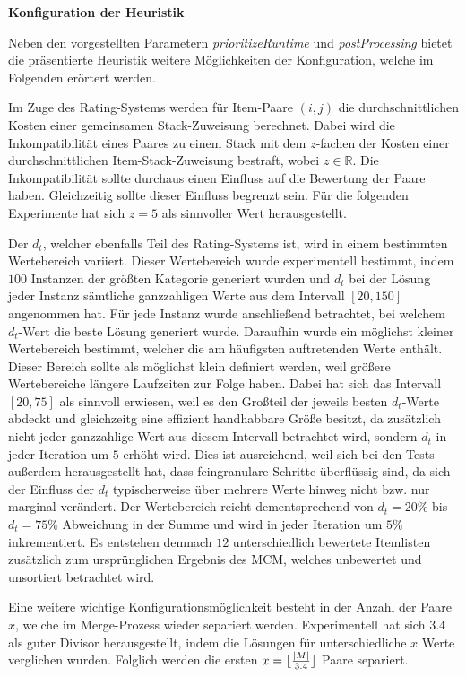 \textbf{Konfiguration der Heuristik}

Neben den vorgestellten Parametern \textit{prioritizeRuntime} und \textit{postProcessing} bietet
die präsentierte Heuristik weitere Möglichkeiten der Konfiguration, welche im Folgenden erörtert werden.

\vfill
\pagebreak

Im Zuge des Rating-Systems werden für Item-Paare $(i, j)$ die durchschnittlichen Kosten einer gemeinsamen
Stack-Zuweisung berechnet. Dabei wird die Inkompatibilität eines Paares zu einem Stack mit dem $z$-fachen
der Kosten einer durchschnittlichen Item-Stack-Zuweisung bestraft, wobei $z \in \mathbb{R}$.
Die Inkompatibilität sollte durchaus einen Einfluss auf die Bewertung der Paare haben.
Gleichzeitig sollte dieser Einfluss begrenzt sein. Für die folgenden Experimente hat sich $z = 5$ als sinnvoller Wert herausgestellt.

Der  $d_t$, welcher ebenfalls Teil des Rating-Systems ist, wird in einem bestimmten
Wertebereich variiert. Dieser Wertebereich wurde experimentell bestimmt, indem $100$ Instanzen der größten Kategorie generiert
wurden und $d_t$ bei der Lösung jeder Instanz sämtliche ganzzahligen Werte aus dem Intervall $[20, 150]$ angenommen hat.
Für jede Instanz wurde anschließend betrachtet, bei welchem $d_t$-Wert die beste Lösung generiert wurde.
Daraufhin wurde ein möglichst kleiner Wertebereich bestimmt, welcher die am häufigsten auftretenden Werte enthält.
Dieser Bereich sollte als möglichst klein definiert werden, weil größere Wertebereiche längere Laufzeiten zur Folge haben.
Dabei hat sich das Intervall $[20, 75]$ als sinnvoll erwiesen, weil es den Großteil der jeweils besten $d_t$-Werte
abdeckt und gleichzeitg eine effizient handhabbare Größe besitzt, da zusätzlich nicht jeder ganzzahlige Wert aus diesem Intervall betrachtet wird, sondern $d_t$ in jeder Iteration um $5$ erhöht wird. Dies ist ausreichend, weil sich bei den Tests außerdem herausgestellt hat, dass feingranulare Schritte überflüssig sind, da sich der Einfluss der $d_t$ typischerweise über mehrere Werte hinweg nicht bzw. nur marginal verändert. Der Wertebereich reicht dementsprechend von
$d_t = 20 \%$ bis $d_t = 75 \%$ Abweichung in der Summe und wird in jeder Iteration um $5 \%$ inkrementiert.
Es entstehen demnach $12$ unterschiedlich bewertete Itemlisten zusätzlich zum ursprünglichen Ergebnis des \textsc{MCM},
welches unbewertet und unsortiert betrachtet wird.

Eine weitere wichtige Konfigurationsmöglichkeit besteht in der Anzahl der Paare $x$, welche im Merge-Prozess wieder
separiert werden. Experimentell hat sich $3.4$ als guter Divisor herausgestellt, indem die Lösungen für unterschiedliche $x$ Werte verglichen wurden. Folglich werden die ersten $x = \lfloor\frac{|M|}{3.4}\rfloor$ Paare separiert.\newline


